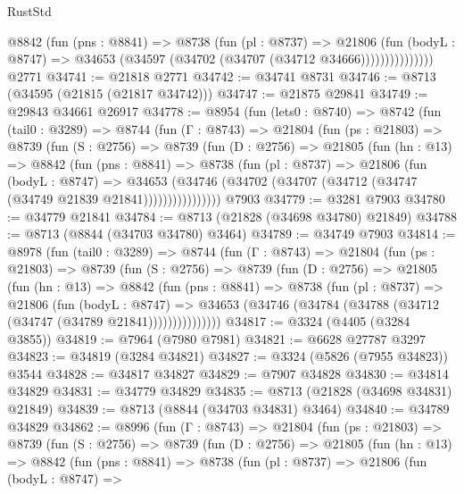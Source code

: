 \begin{lexlean}{RustStd}
\begin{coremodule}
                  @8842
                    (fun (pns : @8841) =>
                    @8738
                      (fun (pl : @8737) =>
                      @21806
                        (fun (bodyL : @8747) =>
                        @34653 (@34597 (@34702 (@34707 (@34712 @34666)))))))))))))))
    @2771
@34741 := @21818 @2771
@34742 := @34741 @8731
@34746 := @8713 (@34595 (@21815 (@21817 @34742)))
@34747 := @21875 @29841
@34749 := @29843 @34661 @26917
@34778 := @8954
    (fun (lets0 : @8740) =>
    @8742
      (fun (tail0 : @3289) =>
      @8744
        (fun (Γ : @8743) =>
        @21804
          (fun (ps : @21803) =>
          @8739
            (fun (S : @2756) =>
            @8739
              (fun (D : @2756) =>
              @21805
                (fun (hn : @13) =>
                @8842
                  (fun (pns : @8841) =>
                  @8738
                    (fun (pl : @8737) =>
                    @21806
                      (fun (bodyL : @8747) =>
                      @34653
                        (@34746
                          (@34702 (@34707 (@34712 (@34747 (@34749 @21839 @21841))))))))))))))))
    @7903
@34779 := @3281 @7903
@34780 := @34779 @21841
@34784 := @8713 (@21828 (@34698 @34780) @21849)
@34788 := @8713 (@8844 (@34703 @34780) @3464)
@34789 := @34749 @7903
@34814 := @8978
    (fun (tail0 : @3289) =>
    @8744
      (fun (Γ : @8743) =>
      @21804
        (fun (ps : @21803) =>
        @8739
          (fun (S : @2756) =>
          @8739
            (fun (D : @2756) =>
            @21805
              (fun (hn : @13) =>
              @8842
                (fun (pns : @8841) =>
                @8738
                  (fun (pl : @8737) =>
                  @21806
                    (fun (bodyL : @8747) =>
                    @34653 (@34746 (@34784 (@34788 (@34712 (@34747 (@34789 @21841)))))))))))))))
@34817 := @3324 (@4405 (@3284 @3855))
@34819 := @7964 (@7980 @7981)
@34821 := @6628 @27787 @3297
@34823 := @34819 (@3284 @34821)
@34827 := @3324 (@5826 (@7955 @34823)) @3544
@34828 := @34817 @34827
@34829 := @7907 @34828
@34830 := @34814 @34829
@34831 := @34779 @34829
@34835 := @8713 (@21828 (@34698 @34831) @21849)
@34839 := @8713 (@8844 (@34703 @34831) @3464)
@34840 := @34789 @34829
@34862 := @8996
    (fun (Γ : @8743) =>
    @21804
      (fun (ps : @21803) =>
      @8739
        (fun (S : @2756) =>
        @8739
          (fun (D : @2756) =>
          @21805
            (fun (hn : @13) =>
            @8842
              (fun (pns : @8841) =>
              @8738
                (fun (pl : @8737) =>
                @21806
                  (fun (bodyL : @8747) =>

\end{coremodule}
\end{lexlean}
